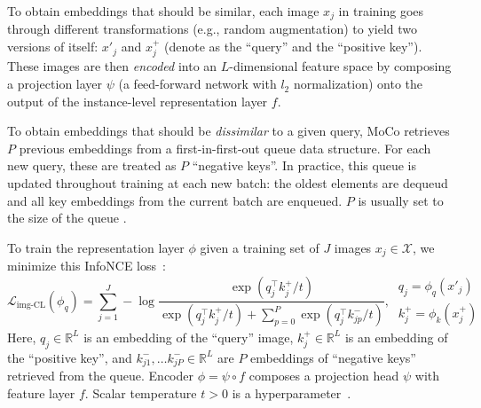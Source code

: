 To obtain embeddings that should be similar, %
each image $x_j$ in training goes through different transformations (e.g., random augmentation) to yield two versions of itself: $x'_j$ and $x^+_j$ (denote as the ``query'' and the ``positive key''). These images are then \emph{encoded} into an $L$-dimensional feature space by composing a projection layer $\psi$ (a feed-forward network with $l_2$ normalization) onto the output of the instance-level representation layer $f$.

To obtain embeddings that should be \emph{dissimilar} to a given query, MoCo retrieves $P$ previous embeddings from a first-in-first-out queue data structure.
For each new query, these are treated as $P$ ``negative keys''. In practice, this queue is updated throughout training at each new batch: 
the oldest elements are dequeud and all key embeddings from the current batch are enqueued. $P$ is usually set to the size of the queue \citep{he2020momentum}.  


To train the representation layer $\phi$ given a training set of $J$ images $x_j \in \mathcal{X}$, we minimize this InfoNCE loss~\citep{oord2018representation}:
\begin{equation}
    \label{eq:regular InfoNCE}
    \mathcal{L}_{\text{img-CL}}(\phi_q) = \sum_{j=1}^J -\log \frac{\exp(q_j^{\top} k^+_j/t)}{\exp(q_j^{\top} k^+_j/t)+\sum_{p=0}^P \exp(q_j^{\top} k^{-}_{jp}/t)}, 
    ~ 
    \begin{array}{cc}
    q_j = \phi_{q}(x'_j)
    \\
    k^+_j = \phi_{k}(x^+_j)
    \end{array}
\end{equation}
\noindent Here, $q_j \in \mathbb{R}^L$ is an embedding of the ``query'' image, $k_j^+ \in \mathbb{R}^L$ is an embedding of the ``positive key'', and $k^-_{j1}, \ldots k^-_{jP} \in \mathbb{R}^L$ are $P$ embeddings of ``negative keys'' retrieved from the queue. Encoder $\phi = \psi \circ f$ composes a projection head $\psi$ with feature layer $f$. Scalar temperature $t > 0$ is a  hyperparameter~\citep{he2020momentum}. 

